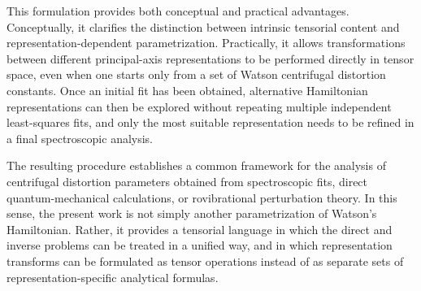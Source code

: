 This formulation provides both conceptual and practical advantages.
Conceptually, it clarifies the distinction between intrinsic tensorial
content and representation-dependent parametrization.  Practically, it
allows transformations between different principal-axis
representations to be performed directly in tensor space, even when one
starts only from a set of Watson centrifugal distortion constants.
Once an initial fit has been obtained, alternative Hamiltonian
representations can then be explored without repeating multiple
independent least-squares fits, and only the most suitable
representation needs to be refined in a final spectroscopic analysis.

The resulting procedure establishes a common framework for the analysis
of centrifugal distortion parameters obtained from spectroscopic fits,
direct quantum-mechanical calculations, or rovibrational perturbation
theory.  In this sense, the present work is not simply another
parametrization of Watson's Hamiltonian.  Rather, it provides a
tensorial language in which the direct and inverse problems can be
treated in a unified way, and in which representation transforms can
be formulated as tensor operations instead of as separate sets of
representation-specific analytical formulas.
